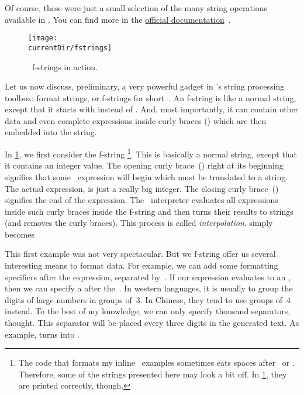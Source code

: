 Of course, these were just a small selection of the many string operations available in \python.
You can find more in the \href{https://docs.python.org/3/library/stdtypes.html\#textseq}{official documentation}~\cite{PSF2024TSTS}.%
\endhsection%
%
%
%
\begin{figure}%
\centering%
\texttt{[image: \\currentDir/fstrings]}%
\caption{\python\ f-strings in action.}%
\label{fig:fstrings}%
\end{figure}%
%
Let us now discuss, preliminary, a very powerful gadget in \python's string processing toolbox: format strings, or f\nobreakdash-strings for short~\cite{PSF2024FSL,S2016P4LSI,M2017WAFSIPAHCIUT,B2023PFS}.
An f-string is like a normal string, except that it starts with  instead of .
And, most importantly, it can contain other data and even complete expressions inside curly braces (\pythonIdx{\textbraceleft}\pythonIdx{\textbraceright}) which are then embedded into the string.%
%
\begin{sloppypar}%
In \cref{fig:fstrings}, we first consider the f-string \footnote{
The code that formats my inline \python\ examples sometimes eats spaces after \textbraceleft\ or \textbraceright. %
Therefore, some of the strings presented here may look a bit off. %
In \cref{fig:fstrings}, they are printed correctly, though.}.
This is basically a normal string, except that it contains an integer value.
The opening curly brace~(\inQuotes{\textbraceleft}) right at its beginning signifies that some \python\ expression will begin which must be translated to a string.
The actual expression,  is just a really big integer.
The closing curly brace~(\inQuotes{\textbraceright}) signifies the end of the expression.
The \python\ interpreter evaluates all expressions inside such curly braces inside the f-string and then turns their results to strings (and removes the curly braces).
This process is called \emph{interpolation}.
 simply becomes %
\end{sloppypar}%
%
\begin{sloppypar}%
This first example was not very spectacular.
But we f-string offer us several interesting means to format data.
For example, we can add some formatting specifiers after the expression, separated by~\pythonilIdx{:}.
If our expression evaluates to an , then we can specify a  after the~\pythonilIdx{:}.
In western languages, it is usually to group the digits of large numbers in groups of~3.
In Chinese, they tend to use groups of~4 instead.
To the best of my knowledge, we can only specify thousand separators, thought.
This separator will be placed every three digits in the generated text.
As example,  turns into .%
\end{sloppypar}%
